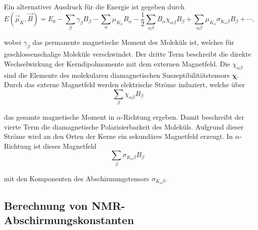 Ein alternativer Ausdruck für die Energie ist gegeben durch
\begin{equation}\label{eq:evonbmu}
 E(\vec{\mu}_K,\vec{B})=E_0-\sum_\beta \gamma_\beta B_\beta-\sum_{\alpha}\mu_{K_\alpha}B_\alpha-\frac{1}{2}\sum_{\alpha\beta}B_\alpha\chi_{\alpha\beta} B_\beta+\sum_{\alpha\beta}\mu_{K_\alpha}\sigma_{K_\alpha \beta}B_\beta+\cdots, 
\end{equation}

wobei $\gamma_\beta$ das permanente magnetische Moment des Moleküls ist, welches für geschlossenschalige Moleküle verschwindet. Der dritte Term beschreibt die direkte Wechselwirkung der Kerndipolmomente mit dem externen Magnetfeld. Die $\chi_{\alpha\beta}$ sind die Elemente des molekularen diamagnetischen Suszeptibilitätstensors $\boldsymbol{\chi}$. Durch das externe Magnetfeld werden elektrische Ströme induziert, welche über 
\begin{equation}
\sum_{\beta}\chi_{\alpha\beta} B_\beta
\end{equation} 

das gesamte magnetische Moment in $\alpha$-Richtung ergeben. Damit beschreibt der vierte Term die diamagnetische Polarisierbarkeit des Moleküls. Aufgrund dieser Ströme wird an den Orten der Kerne ein sekundäres Magnetfeld erzeugt. In $\alpha$-Richtung ist dieses Magnetfeld
\begin{equation}\label{eq:sekbfeld}
\sum_{\beta}\sigma_{K_\alpha\beta} B_\beta\, 
\end{equation}

mit den Komponenten des Abschirmungstensors $\sigma_{K_\alpha\beta}$.

%

	\subsection{Berechnung von NMR-Abschirmungskonstanten}\label{theo:nmr}
	
